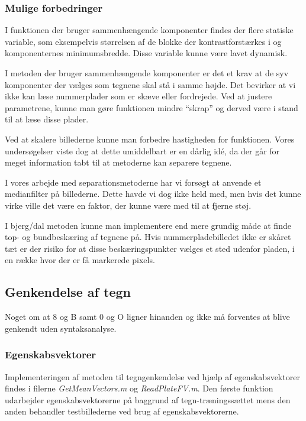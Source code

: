 \subsubsection{Mulige forbedringer}
I funktionen der bruger sammenhængende komponenter findes der flere statiske variable, som eksempelvis størrelsen af de blokke der kontrastforstærkes i og komponenternes minimumsbredde. Disse variable kunne være lavet dynamisk.

I metoden der bruger sammenhængende komponenter er det et krav at de syv komponenter der vælges som tegnene skal stå i samme højde. Det bevirker at vi ikke kan læse nummerplader som er skæve eller fordrejede. Ved at justere parametrene, kunne man gøre funktionen mindre ``skrap'' og derved være i stand til at læse disse plader.

Ved at skalere billederne kunne man forbedre hastigheden for funktionen. Vores undersøgelser viste dog at dette umiddelbart er en dårlig idé, da der går for meget information tabt til at metoderne kan separere tegnene.

I vores arbejde med separationsmetoderne har vi forsøgt at anvende et medianfilter på billederne. Dette havde vi dog ikke held med, men hvis det kunne virke ville det være en faktor, der kunne være med til at fjerne støj.

I bjerg/dal metoden kunne man implementere end mere grundig måde at finde top- og bundbeskæring af tegnene på. Hvis nummerpladebilledet ikke er skåret tæt er der risiko for at disse beskæringspunkter vælges et sted udenfor pladen, i en række hvor der er få markerede pixels.



\subsection{Genkendelse af tegn}

Noget om at 8 og B samt 0 og O ligner hinanden og ikke må forventes at blive genkendt uden syntaksanalyse.

\subsubsection{Egenskabsvektorer}

Implementeringen af metoden til tegngenkendelse ved hjælp af egenskabsvektorer findes i filerne \textit{GetMeanVectors.m} og \textit{ReadPlateFV.m}. Den første funktion udarbejder egenskabsvektorerne på baggrund af tegn-træningssættet mens den anden behandler testbillederne ved brug af egenskabsvektorerne.

